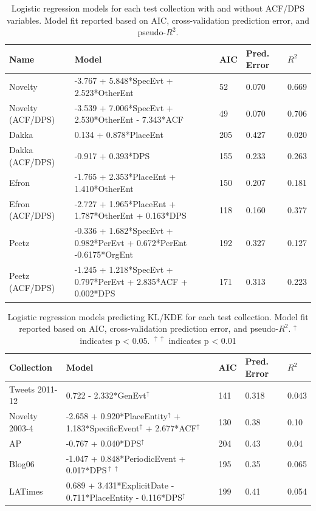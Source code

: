 \documentclass{sig-alternate}
\begin{document}
\begin{table}
\small
\begin{tabular}{| l | l | l | l | l |} \hline
\bf{Name} & \bf{Model} & \bf{AIC} & \bf{Pred. Error} & \bf{$R^2$} \\ \hline
Novelty 	&  -3.767 + 5.848*SpecEvt + 2.523*OtherEnt & 52 & 0.070 & 0.669 \\ \hline
Novelty (ACF/DPS)		&  -3.539 + 7.006*SpecEvt + 2.530*OtherEnt - 7.343*ACF & 49 & 0.070 & 0.706 \\ \hline
Dakka	&  0.134 + 0.878*PlaceEnt  & 205 & 0.427 & 0.020 \\ \hline
Dakka (ACF/DPS) 		& -0.917 + 0.393*DPS 	& 155 & 0.233 & 0.263  \\ \hline
Efron	& -1.765 + 2.353*PlaceEnt + 1.410*OtherEnt & 150 &0.207& 0.181 \\ \hline
Efron (ACF/DPS) 		& -2.727 + 1.965*PlaceEnt + 1.787*OtherEnt  + 0.163*DPS & 118 & 0.160 & 0.377 \\ \hline
Peetz & -0.336 + 1.682*SpecEvt + 0.982*PerEvt + 0.672*PerEnt -0.6175*OrgEnt & 192 & 0.327 & 0.127 \\ \hline
Peetz (ACF/DPS) 		& -1.245 + 1.218*SpecEvt + 0.797*PerEvt + 2.835*ACF + 0.002*DPS & 171 & 0.313 & 0.223 \\ \hline
\end{tabular}
\label{table.regresults}
\caption{Logistic regression models for each test collection with and without ACF/DPS variables. Model fit reported based on AIC, cross-validation prediction error, and pseudo-$R^2$.}
\end{table}

\begin{table}
\small
\begin{tabular}{| l | l | l | l | l |} \hline
\bf{Collection} 	& \bf{Model} & \bf{AIC} & \bf{Pred. Error} & \bf{$R^2$} \\ \hline
Tweets 2011-12	& 0.722 - 2.332*GenEvt$^\uparrow$  & 141 & 0.318 & 0.043  \\ \hline
Novelty 2003-4 		& -2.658 + 0.920*PlaceEntity$^\uparrow$  + 1.183*SpecificEvent$^\uparrow$  + 2.677*ACF$^\uparrow$  & 130 & 0.38 & 0.10 \\ \hline
AP 			& -0.767 + 0.040*DPS$^\uparrow$  & 204 & 0.43 & 0.04 \\ \hline
Blog06		& -1.047 + 0.848*PeriodicEvent + 0.017*DPS$^{\uparrow\uparrow}$ & 195 & 0.35 & 0.065 \\ \hline
LATimes 		& 0.689 + 3.431*ExplicitDate - 0.711*PlaceEntity - 0.116*DPS$^\uparrow$ & 199 & 0.41 & 0.054 \\ \hline
\end{tabular}
\label{table.regresults}
\caption{Logistic regression models predicting KL/KDE for each test collection. Model fit reported based on AIC, cross-validation prediction error, and pseudo-$R^2$. $^\uparrow$ indicates p < 0.05. $^{\uparrow\uparrow}$ indicates p < 0.01}
\end{table}
\end{document}
